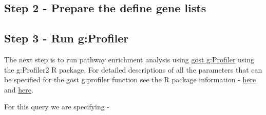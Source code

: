 \documentclass[
]{book}
\newenvironment{Shaded}{\begin{snugshade}}{\end{snugshade}}
\newcommand{\DecValTok}[1]{\textcolor[rgb]{0.00,0.00,0.81}{#1}}
\newcommand{\FloatTok}[1]{\textcolor[rgb]{0.00,0.00,0.81}{#1}}
\newcommand{\FunctionTok}[1]{\textcolor[rgb]{0.13,0.29,0.53}{\textbf{#1}}}
\newcommand{\NormalTok}[1]{#1}
\newcommand{\OtherTok}[1]{\textcolor[rgb]{0.56,0.35,0.01}{#1}}
\newcommand{\SpecialCharTok}[1]{\textcolor[rgb]{0.81,0.36,0.00}{\textbf{#1}}}
\newcommand{\StringTok}[1]{\textcolor[rgb]{0.31,0.60,0.02}{#1}}
\begin{document}
\subsection{Step 2 - Prepare the define gene lists}\label{step-2---prepare-the-define-gene-lists}

\begin{Shaded}
\end{Shaded}

\subsection{Step 3 - Run g:Profiler}\label{step-3---run-gprofiler}

The next step is to run pathway enrichment analysis using \href{https://biit.cs.ut.ee/gprofiler/gost}{gost g:Profiler} using the g:Profiler2 R package.
For detailed descriptions of all the parameters that can be specified for the gost g:profiler function see the R package information - \href{https://cran.r-project.org/web/packages/gprofiler2/index.html}{here} and \href{https://rdrr.io/cran/gprofiler2/man/gost.html}{here}.

For this query we are specifying -
\end{document}
